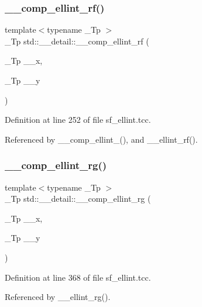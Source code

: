 \subsubsection{\texorpdfstring{\+\_\+\+\_\+comp\+\_\+ellint\+\_\+rf()}{\_\_comp\_ellint\_rf()}}
{\footnotesize\ttfamily template$<$typename \+\_\+\+Tp $>$ \\
\+\_\+\+Tp std\+::\+\_\+\+\_\+detail\+::\+\_\+\+\_\+comp\+\_\+ellint\+\_\+rf (\begin{DoxyParamCaption}\item[{\+\_\+\+Tp}]{\+\_\+\+\_\+x,  }\item[{\+\_\+\+Tp}]{\+\_\+\+\_\+y }\end{DoxyParamCaption})}



Definition at line 252 of file sf\+\_\+ellint.\+tcc.



Referenced by \+\_\+\+\_\+comp\+\_\+ellint\+\_(), and \+\_\+\+\_\+ellint\+\_\+rf().

\mbox{\label{namespacestd_1_1____detail_a31bb5a6e359c88b5bece8dd73f76a2f9}} 
\subsubsection{\texorpdfstring{\+\_\+\+\_\+comp\+\_\+ellint\+\_\+rg()}{\_\_comp\_ellint\_rg()}}
{\footnotesize\ttfamily template$<$typename \+\_\+\+Tp $>$ \\
\+\_\+\+Tp std\+::\+\_\+\+\_\+detail\+::\+\_\+\+\_\+comp\+\_\+ellint\+\_\+rg (\begin{DoxyParamCaption}\item[{\+\_\+\+Tp}]{\+\_\+\+\_\+x,  }\item[{\+\_\+\+Tp}]{\+\_\+\+\_\+y }\end{DoxyParamCaption})}



Definition at line 368 of file sf\+\_\+ellint.\+tcc.



Referenced by \+\_\+\+\_\+ellint\+\_\+rg().

\mbox{\label{namespacestd_1_1____detail_a3cb3151857e9ac01bc442c90301365ee}} 
